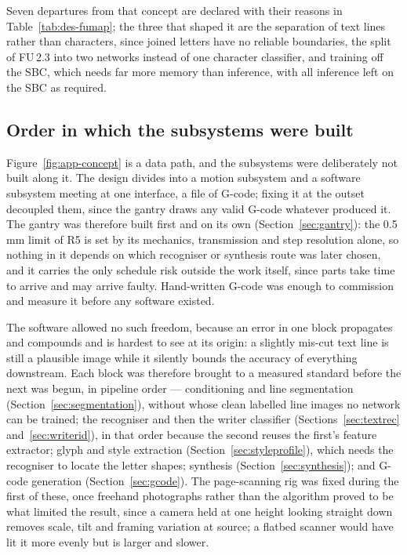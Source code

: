 Seven departures from that concept are declared with their reasons in Table~\ref{tab:des-fumap}; the three that shaped it are the separation of text lines rather than characters, since joined letters have no reliable boundaries, the split of FU\,2.3 into two networks instead of one character classifier, and training off the SBC, which needs far more memory than inference, with all inference left on the SBC as required.   

\subsection{Order in which the subsystems were built}
\label{sec:app-order}

Figure~\ref{fig:app-concept} is a data path, and the subsystems were deliberately not built along it. The design divides into a motion subsystem and a software subsystem meeting at one interface, a file of G-code; fixing it at the outset decoupled them, since the gantry draws any valid G-code whatever produced it. The gantry was therefore built first and on its own (Section~\ref{sec:gantry}): the 0.5\,mm limit of R5 is set by its mechanics, transmission and step resolution alone, so nothing in it depends on which recogniser or synthesis route was later chosen, and it carries the only schedule risk outside the work itself, since parts take time to arrive and may arrive faulty. Hand-written G-code was enough to commission and measure it before any software existed.

The software allowed no such freedom, because an error in one block propagates and compounds and is hardest to see at its origin: a slightly mis-cut text line is still a plausible image while it silently bounds the accuracy of everything downstream. Each block was therefore brought to a measured standard before the next was begun, in pipeline order --- conditioning and line segmentation (Section~\ref{sec:segmentation}), without whose clean labelled line images no network can be trained; the recogniser and then the writer classifier (Sections~\ref{sec:textrec} and~\ref{sec:writerid}), in that order because the second reuses the first's feature extractor; glyph and style extraction (Section~\ref{sec:styleprofile}), which needs the recogniser to locate the letter shapes; synthesis (Section~\ref{sec:synthesis}); and G-code generation (Section~\ref{sec:gcode}). The page-scanning rig was fixed during the first of these, once freehand photographs rather than the algorithm proved to be what limited the result, since a camera held at one height looking straight down removes scale, tilt and framing variation at source; a flatbed scanner would have lit it more evenly but is larger and slower.

